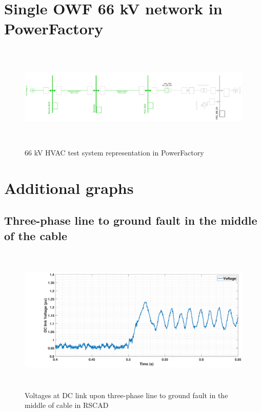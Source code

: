 \section{Single OWF 66 kV network in PowerFactory}
\begin{figure}[H]
\centering
    \includegraphics[height = 5cm,width = 17.5cm]{Diagrams/Appendix_B/WT1_AC_PFD_network_view.pdf}
    \caption{66 kV HVAC test system representation in PowerFactory}
    \label{fig:WT1_AC_PFD_network_view}
\end{figure}

\section{Additional graphs}
\subsection{Three-phase line to ground fault in the middle of the cable}

\begin{figure}[H]
    \includegraphics[height = 7cm,width = \textwidth]{Diagrams/Appendix_B/DC_Voltage_RSCAD.eps}
    \caption{Voltages at DC link upon three-phase line to ground fault in the middle of cable in RSCAD}
    \label{DC_Voltage_RSCAD}
\end{figure}

